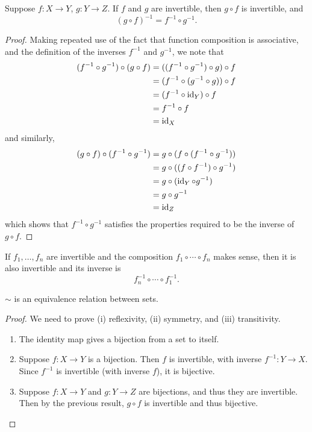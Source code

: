 \begin{proposition}
Suppose $f\colon X \to Y$, $g\colon Y \to Z$. If $f$ and $g$ are invertible, then $g \circ f$ is invertible, and
\[(g \circ f)^{-1}=f^{-1}\circ g^{-1}.\]
\end{proposition}

\begin{proof}
Making repeated use of the fact that function composition is associative, and the definition of the inverses $f^{-1}$ and $g^{-1}$, we note that
\begin{align*}
(f^{-1}\circ g^{-1}) \circ (g \circ f) 
&= ((f^{-1} \circ g^{-1}) \circ g) \circ f \\
&= (f^{-1} \circ (g^{-1} \circ g)) \circ f \\
&= (f^{-1} \circ \operatorname{id}_Y) \circ f \\
&= f^{-1} \circ f \\
&= \operatorname{id}_X
\end{align*}
and similarly,
\begin{align*}
(g \circ f) \circ (f^{-1} \circ g^{-1}) 
&= g \circ (f \circ (f^{-1} \circ g^{-1})) \\
&= g \circ ((f \circ f^{-1}) \circ g^{-1}) \\
&= g \circ (\operatorname{id}_Y \circ g^{-1}) \\
&= g \circ g^{-1} \\
&= \operatorname{id}_Z
\end{align*}
which shows that $f^{-1} \circ g^{-1}$ satisfies the properties required to be the inverse of $g \circ f$.
\end{proof}

\begin{corollary}
If $f_1,\dots,f_n$ are invertible and the composition $f_1\circ\cdots\circ f_n$ makes sense, then it is also invertible and its inverse is
\[f_n^{-1}\circ\cdots\circ f_1^{-1}.\]
\end{corollary}

\begin{proposition}
$\sim$ is an equivalence relation between sets.
\end{proposition}

\begin{proof}
We need to prove (i) reflexivity, (ii) symmetry, and (iii) transitivity.
\begin{enumerate}[label=(\roman*)]
\item The identity map gives a bijection from a set to itself.
\item Suppose $f\colon X\to Y$ is a bijection. Then $f$ is invertible, with inverse $f^{-1}\colon Y\to X$. Since $f^{-1}$ is invertible (with inverse $f$), it is bijective.
\item Suppose $f\colon X\to Y$ and $g\colon Y\to Z$ are bijections, and thus they are invertible. Then by the previous result, $g\circ f$ is invertible and thus bijective.
\end{enumerate}
\end{proof}

